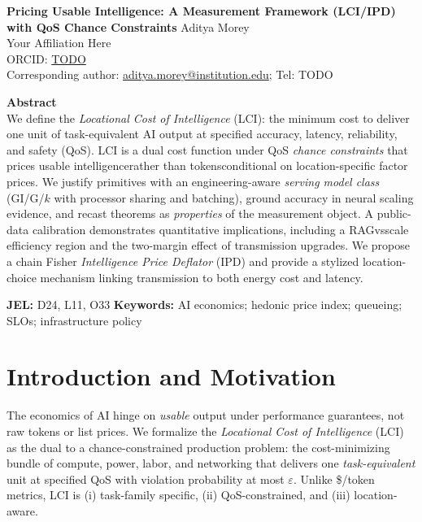 ﻿\documentclass[12pt]{article}
\numberwithin{equation}{section}
\begin{document}
\begin{center}
{\LARGE \textbf{Pricing Usable Intelligence: A Measurement Framework (LCI/IPD) with QoS Chance Constraints}}
\vspace{0.6cm}
Aditya Morey\\[2pt]
\small{Your Affiliation Here}\\[4pt]
\small{ORCID: \href{https://orcid.org/TODO}{TODO}}\\[4pt]
\small{Corresponding author: \href{mailto:aditya.morey@institution.edu}{aditya.morey@institution.edu}; Tel: TODO}\\[6pt]
\end{center}

\noindent\textbf{Abstract}\\
We define the \emph{Locational Cost of Intelligence} (LCI): the minimum cost to deliver one unit of task-equivalent AI output at specified accuracy, latency, reliability, and safety (QoS). LCI is a dual cost function under QoS \emph{chance constraints} that prices usable intelligencerather than tokensconditional on location-specific factor prices. We justify primitives with an engineering-aware \emph{serving model class} (GI/G/$k$ with processor sharing and batching), ground accuracy in neural scaling evidence, and recast theorems as \emph{properties} of the measurement object. A public-data calibration demonstrates quantitative implications, including a RAGvsscale efficiency region and the two-margin effect of transmission upgrades. We propose a chain Fisher \emph{Intelligence Price Deflator} (IPD) and provide a stylized location-choice mechanism linking transmission to both energy cost and latency.

\vspace{0.2cm}\noindent\textbf{JEL:} D24, L11, O33 \quad
\textbf{Keywords:} AI economics; hedonic price index; queueing; SLOs; infrastructure policy

\newpage
\section{Introduction and Motivation}
The economics of AI hinge on \emph{usable} output under performance guarantees, not raw tokens or list prices. We formalize the \emph{Locational Cost of Intelligence} (LCI) as the dual to a chance-constrained production problem: the cost-minimizing bundle of compute, power, labor, and networking that delivers one \emph{task-equivalent} unit at specified QoS with violation probability at most $\varepsilon$. Unlike \$/token metrics, LCI is (i) task-family specific, (ii) QoS-constrained, and (iii) location-aware.
\end{document}
